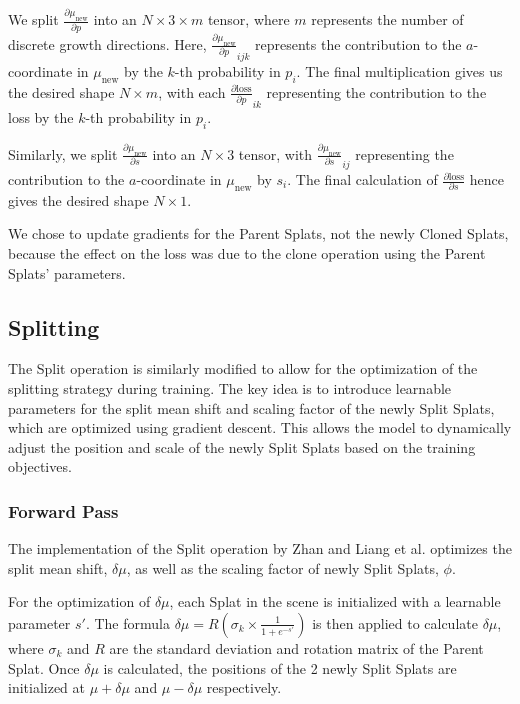 \documentclass[11pt]{report}
\begin{document}
We split $\frac{\partial \mu_{\text{new}}}{\partial p}$ into an $N \times 3 \times m$ tensor, where $m$ represents the number of discrete growth directions. Here, $\frac{\partial \mu_{\text{new}}}{\partial p}_{ijk}$ represents the contribution to the $a$-coordinate in $\mu_{\text{new}}$ by the $k$-th probability in $p_i$. The final multiplication gives us the desired shape $N \times m$, with each $\frac{\partial \text{loss}}{\partial p}_{ik}$ representing the contribution to the loss by the $k$-th probability in $p_i$.

Similarly, we split $\frac{\partial \mu_{\text{new}}}{\partial s}$ into an $N \times 3$ tensor, with $\frac{\partial \mu_{\text{new}}}{\partial s}_{ij}$ representing the contribution to the $a$-coordinate in $\mu_{\text{new}}$ by $s_{i}$. The final calculation of $\frac{\partial \text{loss}}{\partial s}$ hence gives the desired shape $N \times 1$.

We chose to update gradients for the Parent Splats, not the newly Cloned Splats, because the effect on the loss was due to the clone operation using the Parent Splats' parameters.

\subsection{Splitting}
The Split operation is similarly modified to allow for the optimization of the splitting strategy during training. The key idea is to introduce learnable parameters for the split mean shift and scaling factor of the newly Split Splats, which are optimized using gradient descent. This allows the model to dynamically adjust the position and scale of the newly Split Splats based on the training objectives.

\subsubsection{Forward Pass}
The implementation of the Split operation by Zhan and Liang et al. optimizes the split mean shift, $\delta \mu$, as well as the scaling factor of newly Split Splats, $\phi$.

For the optimization of $\delta \mu$, each Splat in the scene is initialized with a learnable parameter $s'$. The formula $\delta \mu = R(\sigma_{k} \times \frac{1}{1 + e^{-s'}})$ is then applied to calculate $\delta \mu$, where $\sigma_{k}$ and $R$ are the standard deviation and rotation matrix of the Parent Splat. Once $\delta \mu$ is calculated, the positions of the 2 newly Split Splats are initialized at $\mu + \delta \mu$ and $\mu - \delta \mu$ respectively.
\end{document}
